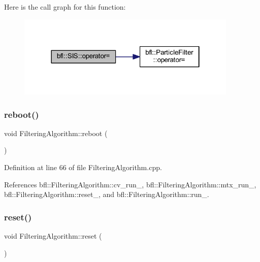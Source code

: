 Here is the call graph for this function\+:
\nopagebreak
\begin{figure}[H]
\begin{center}
\leavevmode
\includegraphics[width=298pt]{classbfl_1_1SIS_a32458a24446df8126ace63f21de2bf02_cgraph}
\end{center}
\end{figure}
\mbox{\label{classbfl_1_1FilteringAlgorithm_a6022859aa985474fb997343cc935b11e}} 
\subsubsection{\texorpdfstring{reboot()}{reboot()}}
{\footnotesize\ttfamily void Filtering\+Algorithm\+::reboot (\begin{DoxyParamCaption}{ }\end{DoxyParamCaption})\hspace{0.3cm}{\ttfamily [inherited]}}



Definition at line 66 of file Filtering\+Algorithm.\+cpp.



References bfl\+::\+Filtering\+Algorithm\+::cv\+\_\+run\+\_\+, bfl\+::\+Filtering\+Algorithm\+::mtx\+\_\+run\+\_\+, bfl\+::\+Filtering\+Algorithm\+::reset\+\_\+, and bfl\+::\+Filtering\+Algorithm\+::run\+\_\+.

\mbox{\label{classbfl_1_1FilteringAlgorithm_a2403c62fbd7bd7f5cda56a84f5f30331}} 
\subsubsection{\texorpdfstring{reset()}{reset()}}
{\footnotesize\ttfamily void Filtering\+Algorithm\+::reset (\begin{DoxyParamCaption}{ }\end{DoxyParamCaption})\hspace{0.3cm}{\ttfamily [inherited]}}



